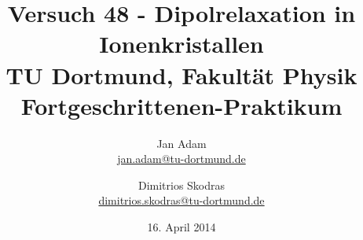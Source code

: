 



\title{Versuch 48 - Dipolrelaxation in Ionenkristallen\\				%
\large TU Dortmund, Fakultät Physik\\ 
\normalsize Fortgeschrittenen-Praktikum}

\author{Jan Adam\\			%
{\small \href{jan.adam@tu-dortmund.de}{jan.adam@tu-dortmund.de}}	%
\and						%
Dimitrios Skodras\\					%
{\small \href{dimitrios.skodras@tu-dortmund.de}{dimitrios.skodras@tu-dortmund.de}}		%
}
\date{16. April 2014}				%





\maketitle					%
\thispagestyle{empty} 				%



\tableofcontents


\newpage					%


